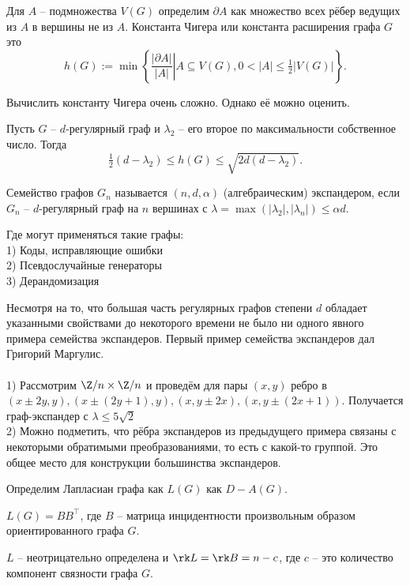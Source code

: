 \dfn Для $A$ -- подмножества $V(G)$ определим $\partial A$ как множество всех рёбер ведущих из $A$ в вершины не из $A$. Константа Чигера или константа расширения графа  $G$ это 
$$h(G) := \min \left\{ \left. \frac{| \partial A |}{| A |} \right|   A \subseteq V(G), 0 < | A | \leq \tfrac{1}{2} | V(G)| \right\} .$$
\edfn

Вычислить константу Чигера очень сложно. Однако её можно оценить.

\begin{thmm} Пусть $G$ -- $d$-регулярный граф и $\lambda_2$ -- его второе по максимальности собственное число. Тогда
$$\tfrac{1}{2}(d - \lambda_2) \le h(G) \le \sqrt{2d(d - \lambda_2)}.$$
\end{thmm}



\dfn Семейство графов $G_n$ называется $(n,d,\alpha)$ (алгебраическим) экспандером, если $G_n$ -- $d$-регулярный граф на $n$ вершинах с $\lambda=\max(|\lambda_2|,|\lambda_n|)\leq \alpha d$.
\edfn

Где могут применяться такие графы:\\
1) Коды, исправляющие ошибки\\
2) Псевдослучайные генераторы\\
3) Дерандомизация

Несмотря на то, что большая часть регулярных графов степени $d$ обладает указанными свойствами  до некоторого времени не было ни одного явного примера семейства экспандеров. Первый пример семейства экспандеров дал Григорий Маргулис. \\


\exm\\
1) Рассмотрим $\Z/n \times \Z/n$ и проведём для пары $(x,y)$ ребро в $(x \pm 2y,y), (x \pm (2y+1),y), (x,y \pm 2x), (x,y \pm (2x+1))$. Получается граф-экспандер с $\lambda \leq 5\sqrt{2}$\\
2) Можно подметить, что рёбра экспандеров из предыдущего примера связаны с некоторыми обратимыми преобразованиями, то есть с какой-то группой. Это общее место для конструкции большинства экспандеров.



\dfn Определим Лапласиан графа как $L(G)$ как $D-A(G)$.
\edfn

\zd $L(G)=B B^\top$, где $B$ -- матрица инцидентности произвольным образом ориентированного графа $G$.
\ezd

\zd $L$ -- неотрицательно определена и  $\rk L= \rk B=n-c$, где $c$ -- это количество компонент связности графа $G$.
\ezd



